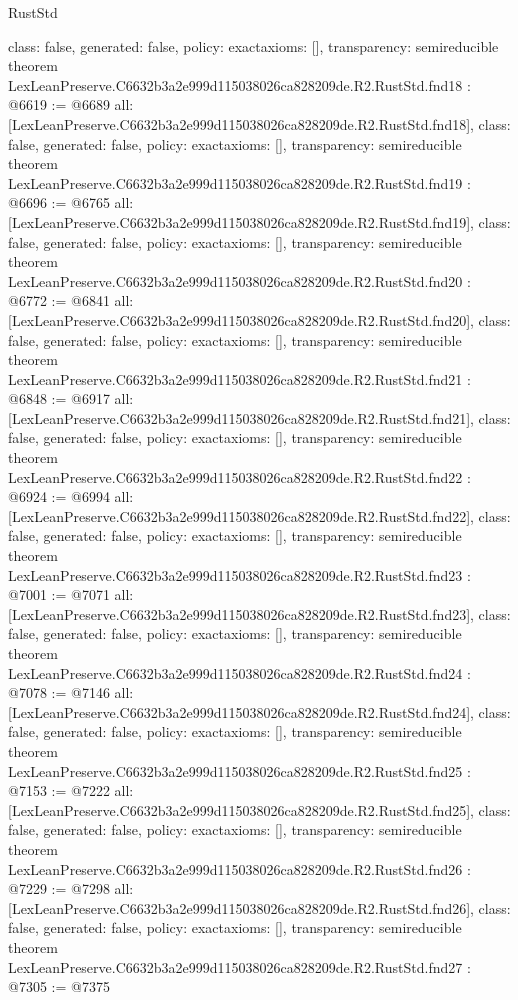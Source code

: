 \begin{lexlean}{RustStd}
\begin{coremodule}
{  class: false,
  generated: false,
  policy: exact{axioms: []},
  transparency: semireducible
}
theorem LexLeanPreserve.C6632b3a2e999d115038026ca828209de.R2.RustStd.fnd18 : @6619 := @6689 {
  all: [LexLeanPreserve.C6632b3a2e999d115038026ca828209de.R2.RustStd.fnd18],
  class: false,
  generated: false,
  policy: exact{axioms: []},
  transparency: semireducible
}
theorem LexLeanPreserve.C6632b3a2e999d115038026ca828209de.R2.RustStd.fnd19 : @6696 := @6765 {
  all: [LexLeanPreserve.C6632b3a2e999d115038026ca828209de.R2.RustStd.fnd19],
  class: false,
  generated: false,
  policy: exact{axioms: []},
  transparency: semireducible
}
theorem LexLeanPreserve.C6632b3a2e999d115038026ca828209de.R2.RustStd.fnd20 : @6772 := @6841 {
  all: [LexLeanPreserve.C6632b3a2e999d115038026ca828209de.R2.RustStd.fnd20],
  class: false,
  generated: false,
  policy: exact{axioms: []},
  transparency: semireducible
}
theorem LexLeanPreserve.C6632b3a2e999d115038026ca828209de.R2.RustStd.fnd21 : @6848 := @6917 {
  all: [LexLeanPreserve.C6632b3a2e999d115038026ca828209de.R2.RustStd.fnd21],
  class: false,
  generated: false,
  policy: exact{axioms: []},
  transparency: semireducible
}
theorem LexLeanPreserve.C6632b3a2e999d115038026ca828209de.R2.RustStd.fnd22 : @6924 := @6994 {
  all: [LexLeanPreserve.C6632b3a2e999d115038026ca828209de.R2.RustStd.fnd22],
  class: false,
  generated: false,
  policy: exact{axioms: []},
  transparency: semireducible
}
theorem LexLeanPreserve.C6632b3a2e999d115038026ca828209de.R2.RustStd.fnd23 : @7001 := @7071 {
  all: [LexLeanPreserve.C6632b3a2e999d115038026ca828209de.R2.RustStd.fnd23],
  class: false,
  generated: false,
  policy: exact{axioms: []},
  transparency: semireducible
}
theorem LexLeanPreserve.C6632b3a2e999d115038026ca828209de.R2.RustStd.fnd24 : @7078 := @7146 {
  all: [LexLeanPreserve.C6632b3a2e999d115038026ca828209de.R2.RustStd.fnd24],
  class: false,
  generated: false,
  policy: exact{axioms: []},
  transparency: semireducible
}
theorem LexLeanPreserve.C6632b3a2e999d115038026ca828209de.R2.RustStd.fnd25 : @7153 := @7222 {
  all: [LexLeanPreserve.C6632b3a2e999d115038026ca828209de.R2.RustStd.fnd25],
  class: false,
  generated: false,
  policy: exact{axioms: []},
  transparency: semireducible
}
theorem LexLeanPreserve.C6632b3a2e999d115038026ca828209de.R2.RustStd.fnd26 : @7229 := @7298 {
  all: [LexLeanPreserve.C6632b3a2e999d115038026ca828209de.R2.RustStd.fnd26],
  class: false,
  generated: false,
  policy: exact{axioms: []},
  transparency: semireducible
}
theorem LexLeanPreserve.C6632b3a2e999d115038026ca828209de.R2.RustStd.fnd27 : @7305 := @7375 {
}
\end{coremodule}
\end{lexlean}
